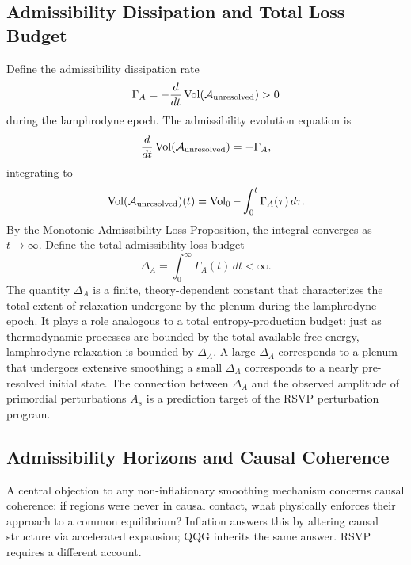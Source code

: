 \documentclass[12pt, a4paper]{article}
\newcommand{\calA}{\mathcal{A}}
\newcommand{\Vol}{\operatorname{Vol}}
\begin{document}
\subsection{Admissibility Dissipation and Total Loss Budget}
\label{sec:dissipation}

Define the admissibility dissipation rate
\begin{equation}
\Gamma_A = -\frac{d}{dt}\Vol(\calA_{\rm unresolved}) > 0
\end{equation}
during the lamphrodyne epoch. The admissibility evolution equation is
\begin{equation}
\frac{d}{dt}\Vol(\calA_{\rm unresolved}) = -\Gamma_A,
\end{equation}
integrating to
\begin{equation}
\Vol(\calA_{\rm unresolved})(t) = \Vol_0 - \int_0^t \Gamma_A(\tau)\,d\tau.
\end{equation}
By the Monotonic Admissibility Loss Proposition, the integral converges as
$t \to \infty$. Define the total admissibility loss budget
\begin{equation}
\Delta_A = \int_0^\infty \Gamma_A(t)\,dt < \infty.
\label{eq:loss_budget}
\end{equation}
The quantity $\Delta_A$ is a finite, theory-dependent constant that characterizes
the total extent of relaxation undergone by the plenum during the lamphrodyne epoch.
It plays a role analogous to a total entropy-production budget: just as thermodynamic
processes are bounded by the total available free energy, lamphrodyne relaxation is
bounded by $\Delta_A$. A large $\Delta_A$ corresponds to a plenum that undergoes
extensive smoothing; a small $\Delta_A$ corresponds to a nearly pre-resolved initial
state. The connection between $\Delta_A$ and the observed amplitude of primordial
perturbations $A_s$ is a prediction target of the RSVP perturbation program.

\subsection{Admissibility Horizons and Causal Coherence}
\label{sec:horizons}

A central objection to any non-inflationary smoothing mechanism concerns causal
coherence: if regions were never in causal contact, what physically enforces their
approach to a common equilibrium? Inflation answers this by altering causal
structure via accelerated expansion; QQG inherits the same answer. RSVP requires a
different account.
\end{document}
